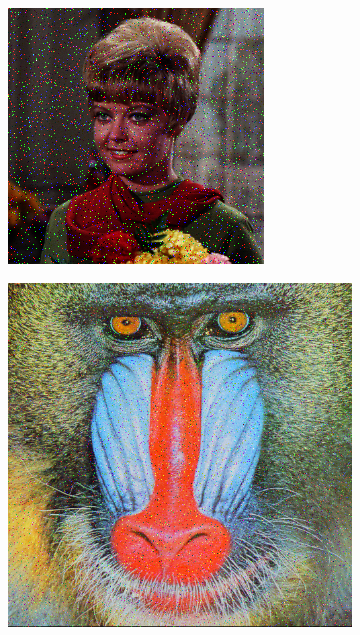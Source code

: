 \begin{subfigure}{0.9\textwidth}
\begin{subfigure}[t]{0.15\textwidth}
    \centering
  \end{subfigure}
\begin{subfigure}[t]{0.15\textwidth}
    \includegraphics[width=0.9\linewidth]{../images/outputs/denoise/before/before2.png}
    
    \centering
  \end{subfigure}
\begin{subfigure}[t]{0.15\textwidth}
    \includegraphics[width=0.9\linewidth]{../images/outputs/denoise/before/before3.png}
    

\end{subfigure}
\end{subfigure}
